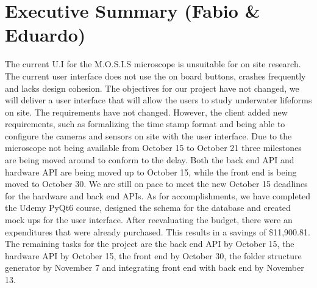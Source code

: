 \section*{Executive Summary (Fabio \& Eduardo)}
\begin{spacing}{1.5}

The current U.I for the M.O.S.I.S microscope is unsuitable for on site research. The current user interface does not use the on board buttons, crashes frequently and lacks design cohesion. The objectives for our project have not changed, we will deliver a user interface that will allow the users to study underwater lifeforms on site. The requirements have not changed. However, the client added new requirements, such as formalizing the time stamp format and being able to configure the cameras and sensors on site with the user interface. Due to the microscope not being available from October 15 to October 21  three milestones are being moved around to conform to the delay. Both the back end API and hardware API are being moved up to October 15, while the front end is being moved to October 30. We are still on pace to meet the new October 15 deadlines for the hardware and back end APIs. As for accomplishments, we have completed the Udemy PyQt6 course, designed the schema for the database and created mock ups for the user interface. After reevaluating the budget, there were an expenditures that were already purchased. This results in a savings of \$11,900.81. The remaining tasks for the project are the back end API by October 15, the hardware API by October 15, the front end by October 30, the folder structure generator by November 7 and integrating front end with back end by November 13.
    
\end{spacing}
